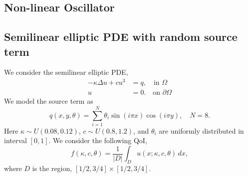 \subsection{Non-linear Oscillator}

\subsection{Semilinear elliptic PDE with random source term}

We consider the semilinear elliptic PDE,
\begin{equation}\label{equ:semilinear}
\begin{aligned}
-\kappa \Delta u + c u^3 &= q, \quad \text{in } \Omega\\
 u &= 0. \quad \text{on } \partial \Omega
\end{aligned}
\end{equation}
We model the source term as 
\begin{equation}
q(x, y, \theta) = \sum_{i = 1}^N \theta_i \sin(i \pi x)
\cos(i \pi y),
\quad N = 8.
\end{equation}
Here $\kappa \sim U(0.08, 0.12)$, $c \sim U(0.8, 1.2)$, 
and $\theta_i$ are uniformly distributed in interval $[0, 1]$. We consider
the following QoI,
\[
     f(\kappa, c, \theta) = \frac{1}{|D|} \int_D u(x; \kappa, c, \theta) \, dx, 
\]
where $D$ is the region, $[1/2, 3/4] \times [1/2, 3/4]$.

































